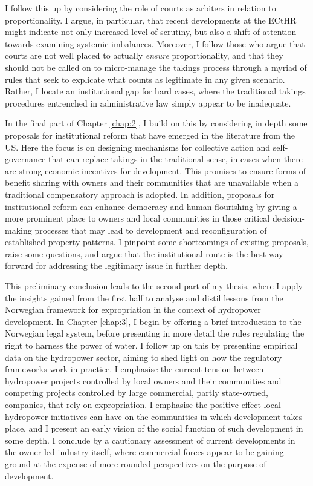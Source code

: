 I follow this up by considering the role of courts as arbiters in relation to proportionality. I argue, in particular, that recent developments at the ECtHR might indicate not only increased level of scrutiny, but also a shift of attention towards examining systemic imbalances. Moreover, I follow those who argue that courts are not well placed to actually {\it ensure} proportionality, and that they should not be called on to micro-manage the takings process through a myriad of rules that seek to explicate what counts as legitimate in any given scenario. Rather, I locate an institutional gap for hard cases, where the traditional takings procedures entrenched in administrative law simply appear to be inadequate.

In the final part of Chapter \ref{chap:2}, I build on this by considering in depth some proposals for institutional reform that have emerged in the literature from the US. Here the focus is on designing mechanisms for collective action and self-governance that can replace takings in the traditional sense, in cases when there are strong economic incentives for development. This promises to ensure forms of benefit sharing with owners and their communities that are unavailable when a traditional compensatory approach is adopted. In addition, proposals for institutional reform can enhance democracy and human flourishing by giving a more prominent place to owners and local communities in those critical decision-making processes that may lead to development and reconfiguration of established property patterns. I pinpoint some shortcomings of existing proposals, raise some questions, and argue that the institutional route is the best way forward for addressing the legitimacy issue in further depth.

This preliminary conclusion leads to the second part of my thesis, where I apply the insights gained from the first half to analyse and distil lessons from the Norwegian framework for expropriation in the context of hydropower development. In Chapter \ref{chap:3}, I begin by offering a brief introduction to the Norwegian legal system, before presenting in more detail the rules regulating the right to harness the power of water. I follow up on this by presenting empirical data on the hydropower sector, aiming to shed light on how the regulatory frameworks work in practice. I emphasise the current tension between hydropower projects controlled by local owners and their communities and competing projects controlled by large commercial, partly state-owned, companies, that rely on expropriation. I emphasise the positive effect local hydropower initiatives can have on the communities in which development takes place, and I present an early vision of the social function of such development in some depth. I conclude by a cautionary assessment of current developments in the owner-led industry itself, where commercial forces appear to be gaining ground at the expense of more rounded perspectives on the purpose of development.

